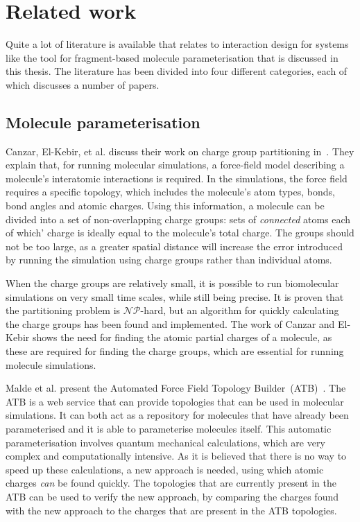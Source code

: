 \chapter{Related work}

Quite a lot of literature is available that relates to interaction design for systems like the tool for fragment-based molecule parameterisation that is discussed in this thesis. The literature has been divided into four different categories, each of which discusses a number of papers.


\section{Molecule parameterisation}
Canzar, El-Kebir, et al. discuss their work on charge group partitioning in~\cite{canzar2012charge}. They explain that, for running molecular simulations, a force-field model describing a molecule's interatomic interactions is required. In the simulations, the force field requires a specific topology, which includes the molecule's atom types, bonds, bond angles and atomic charges. Using this information, a molecule can be divided into a set of non-overlapping charge groups: sets of \emph{connected} atoms each of which' charge is ideally equal to the molecule's total charge. The groups should not be too large, as a greater spatial distance will increase the error introduced by running the simulation using charge groups rather than individual atoms.

When the charge groups are relatively small, it is possible to run biomolecular simulations on very small time scales, while still being precise. It is proven that the partitioning problem is $\mathcal{NP}$-hard, but an algorithm for quickly calculating the charge groups has been found and implemented. The work of Canzar and El-Kebir shows the need for finding the atomic partial charges of a molecule, as these are required for finding the charge groups, which are essential for running molecule simulations.

Malde et al. present the Automated Force Field Topology Builder~(ATB)~\cite{malde2011automated}. The ATB is a web service that can provide topologies that can be used in molecular simulations. It can both act as a repository for molecules that have already been parameterised and it is able to parameterise molecules itself. This automatic parameterisation involves quantum mechanical calculations, which are very complex and computationally intensive. As it is believed that there is no way to speed up these calculations, a new approach is needed, using which atomic charges \emph{can} be found quickly. The topologies that are currently present in the ATB can be used to verify the new approach, by comparing the charges found with the new approach to the charges that are present in the ATB topologies.


